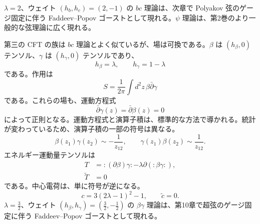 $\lambda=2$、ウェイト $(h_b,h_c)=(2,-1)$ の $bc$ 理論は、次章で Polyakov 弦のゲージ固定に伴う Faddeev--Popov ゴーストとして現れる。$\psi$ 理論は、第2巻のより一般的な弦理論に広く現れる。


第三の CFT の族は $bc$ 理論とよく似ているが、場は可換である。$\beta$ は $(h_\beta,0)$ テンソル、$\gamma$ は $(h_\gamma,0)$ テンソルであり、
\begin{equation}
h_\beta=\lambda,\qquad h_\gamma=1-\lambda
\tag{2.5.19}\label{eq:2.5.19}
\end{equation}
である。作用は
\begin{equation}
S=\frac1{2\pi}\int d^2z\,\beta\bar\partial\gamma
\tag{2.5.20}\label{eq:2.5.20}
\end{equation}
である。これらの場も、運動方程式
\begin{equation}
\bar\partial\gamma(z)=\bar\partial\beta(z)=0
\tag{2.5.21}\label{eq:2.5.21}
\end{equation}
によって正則となる。運動方程式と演算子積は、標準的な方法で導かれる。統計が変わっているため、演算子積の一部の符号は異なる。
\begin{equation}
\beta(z_1)\gamma(z_2)\sim-\frac1{z_{12}},\qquad
\gamma(z_1)\beta(z_2)\sim\frac1{z_{12}}.
\tag{2.5.22}\label{eq:2.5.22}
\end{equation}
エネルギー運動量テンソルは
\begin{align}
T&=:(\partial\beta)\gamma:-\lambda\partial(:\beta\gamma:),
\tag{2.5.23a}\label{eq:2.5.23a}\\
\widetilde T&=0
\tag{2.5.23b}\label{eq:2.5.23b}
\end{align}
である。中心電荷は、単に符号が逆になる。
\begin{equation}
c=3(2\lambda-1)^2-1,\qquad \tilde c=0.
\tag{2.5.24}\label{eq:2.5.24}
\end{equation}
$\lambda=\tfrac32$、ウェイト $(h_\beta,h_\gamma)=(\tfrac32,-\tfrac12)$ の $\beta\gamma$ 理論は、第10章で超弦のゲージ固定に伴う Faddeev--Popov ゴーストとして現れる。
